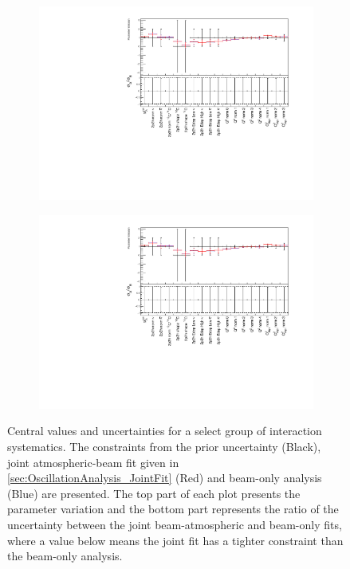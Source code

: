 \begin{figure}[h]
  \begin{subfigure}[t]{0.98\textwidth}
    \includegraphics[width=\textwidth, trim={0mm 0mm 0mm 0mm}, clip,page=1]{Figures/OA/FitComparison.pdf}
  \end{subfigure}
  \begin{subfigure}[t]{0.98\textwidth}
    \includegraphics[width=\textwidth, trim={0mm 0mm 0mm 0mm}, clip,page=4]{Figures/OA/FitComparison.pdf}
  \end{subfigure}
  \caption{Central values and \quickmath{1\sigma} uncertainties for a select group of interaction systematics. The constraints from the prior uncertainty (Black), joint atmospheric-beam fit given in \autoref{sec:OscillationAnalysis_JointFit} (Red) and beam-only analysis \cite{Dunne2020-uf, t2k_tn_393} (Blue) are presented. The top part of each plot presents the parameter variation and the bottom part represents the ratio of the uncertainty between the joint beam-atmospheric and beam-only fits, where a value below  means the joint fit has a tighter constraint than the beam-only analysis. }
  \label{fig:OscillationAnalysis_ParameterConstraints}
\end{figure}

